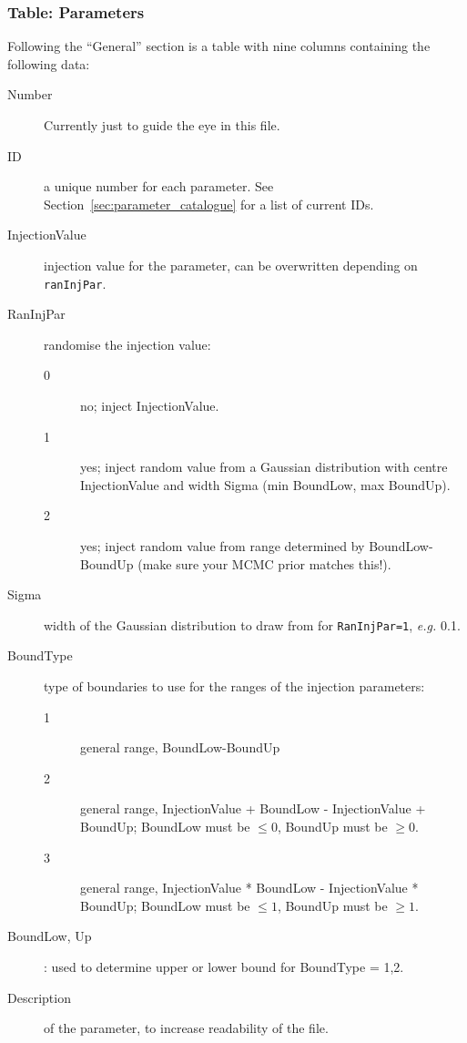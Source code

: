 \subsubsection{Table: Parameters}


Following the ``General'' section is a table with nine columns containing the following data:

\begin{description}
\item[Number] Currently just to guide the eye in this file.
\item[ID] a unique number for each parameter.  See Section~\ref{sec:parameter_catalogue} for a list of current IDs.
\item[InjectionValue] injection value for the parameter, can be overwritten depending on \texttt{ranInjPar}.
\item[RanInjPar] randomise the injection value:
  \begin{description}
  \item[0] no; inject InjectionValue.
  \item[1] yes; inject random value from a Gaussian distribution with centre InjectionValue and width Sigma (min BoundLow, max BoundUp).
  \item[2] yes; inject random value from range determined by BoundLow-BoundUp (make sure your MCMC prior matches this!).
  \end{description}
\item[Sigma] width of the Gaussian distribution to draw from for \texttt{RanInjPar=1}, \textit{e.g.} 0.1.

  
\item[BoundType] type of boundaries to use for the ranges of the injection parameters:
  \begin{description}
  \item[1] general range, BoundLow-BoundUp
  \item[2] general range, InjectionValue + BoundLow - InjectionValue + BoundUp; BoundLow must be $\leq 0$, BoundUp must be $\geq 0$.
  \item[3] general range, InjectionValue * BoundLow - InjectionValue * BoundUp; BoundLow must be $\leq 1$, BoundUp must be $\geq 1$.
  \end{description}
\item[BoundLow, Up]: used to determine upper or lower bound for BoundType = 1,2.
\item[Description] of the parameter, to increase readability of the file.
\end{description}                


